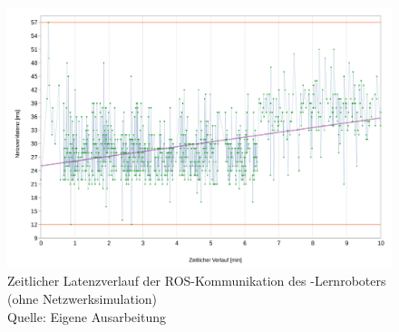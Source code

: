 \begin{figure}[htb]
	\centering
	\includegraphics[width=1.04\textwidth]{images/ergebnisse/Messung_der_ROS_Kommunikation_App_und_keine_Netzwerksimulation}
	\caption[Zeitlicher Latenzverlauf der ROS-Kommunikation des -Lernroboters (ohne Netzwerksimulation)]{Zeitlicher Latenzverlauf der ROS-Kommunikation des -Lernroboters (ohne Netzwerksimulation)\\Quelle: Eigene Ausarbeitung}
	\label{fig:measurement_robot_ros_without_network_simulation}
\end{figure}
\FloatBarrier

